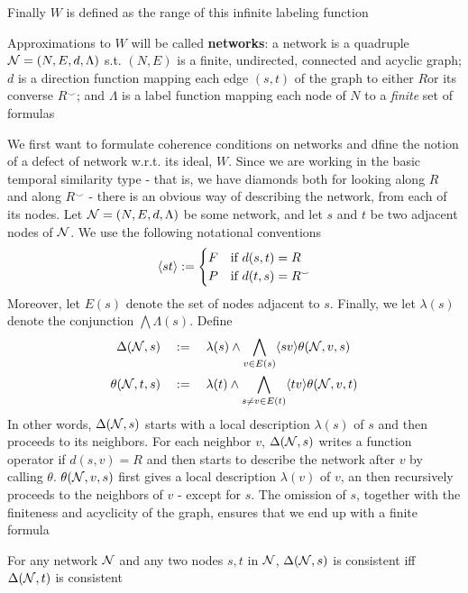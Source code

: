 \documentclass[11pt]{article}
\begin{document}
Finally \(W\) is defined as the range of this infinite labeling function

Approximations to \(W\) will be called \textbf{networks}: a network is a quadruple
\(\mathcal{N}=(N,E,d,\Lambda)\) s.t. \((N,E)\) is a finite, undirected, connected and
acyclic graph; \(d\) is a direction function mapping each edge \((s,t)\) of
the graph to either \(R\)or its converse \(R^{\smallsmile}\); and \(\Lambda\)
is a label function mapping each node of \(N\) to a \emph{finite} set of formulas

We first want to formulate coherence conditions on networks and dfine the
notion of a defect of network w.r.t. its ideal, \(W\). Since we are working
in the basic temporal similarity type - that is, we have diamonds both for
looking along \(R\) and along \(R^\smallsmile\) - there is an obvious way of
describing the network, from each of its nodes. Let \(\mathcal{N}=(N,E,d,\Lambda)\) be
some network, and let \(s\) and \(t\) be two adjacent nodes of \(\mathcal{N}\). We
use the following notational conventions
\begin{equation*}
\langle st\rangle:=
\begin{cases}
F&\text{if }d(s,t)=R\\
P&\text{if }d(t,s)=R^\smallsmile
\end{cases}
\end{equation*}
Moreover, let \(E(s)\) denote the set of nodes adjacent to \(s\). Finally, we
let \(\lambda(s)\) denote the conjunction \(\bigwedge\Lambda(s)\). Define
\begin{align*}
\Delta(\mathcal{N},s)&\quad:=\quad\lambda(s)\wedge\bigwedge_{v\in E(s)}\langle sv\rangle\theta(\mathcal{N},v,s)\\
\theta(\mathcal{N},t,s)&\quad:=\quad\lambda(t)\wedge\bigwedge_{s\neq v\in E(t)}\langle tv\rangle\theta(\mathcal{N},v,t)
\end{align*}
In other words, \(\Delta(\mathcal{N},s)\) starts with a local description \(\lambda(s)\) of
\(s\) and then proceeds to its neighbors. For each neighbor \(v\),
\(\Delta(\mathcal{N},s)\) writes a function operator if \(d(s,v)=R\) and then starts to
describe the network after \(v\) by calling \(\theta\). \(\theta(\mathcal{N},v,s)\) first gives a
local description \(\lambda(v)\) of \(v\), an then recursively proceeds to the
neighbors of \(v\) - except for \(s\). The omission of \(s\), together with
the finiteness and acyclicity of the graph, ensures that we end up with a
finite formula

\begin{lemma}[]
For any network \(\mathcal{N}\) and any two nodes \(s,t\) in \(\mathcal{N}\),
\(\Delta(\mathcal{N},s)\) is consistent iff \(\Delta(\mathcal{N}, t)\) is consistent
\end{lemma}
\end{document}
